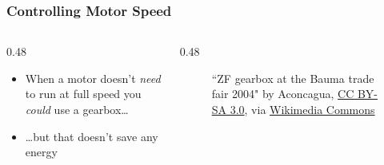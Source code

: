 \begin{frame}
    \frametitle{Controlling Motor Speed}

    \begin{columns}
        \begin{column}{0.48\linewidth}
            \begin{itemize}
                \item When a motor doesn't \emph{need} to run at full speed you \emph{could} use a gearbox\dots
                \item \dots but that doesn't save any energy
            \end{itemize}
        \end{column}        
        \begin{column}{0.48\linewidth}
            \begin{figure}
                \centering

                {\tiny ``ZF gearbox at the Bauma trade fair 2004" by Aconcagua, \href{https://creativecommons.org/licenses/by-sa/3.0}{CC BY-SA 3.0}, via \href{https://commons.wikimedia.org/wiki/File:ZF_Gearbox_Bauma_2004.jpg}{Wikimedia Commons}\par}
            \end{figure}
        \end{column}
    \end{columns}
\end{frame}

